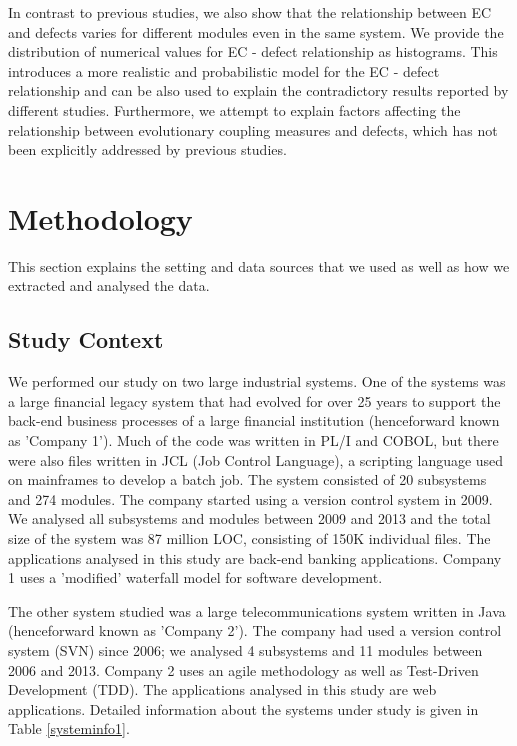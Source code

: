 \documentclass[times]{smrauth}
\begin{document}
In contrast to previous studies, we also show that the relationship between EC and defects varies for different modules even in the same system. We provide the distribution of numerical values for EC - defect relationship as histograms. This introduces a more realistic and probabilistic model for the EC - defect relationship and can be also used to explain the contradictory results reported by different studies. Furthermore, we attempt to explain factors affecting the relationship between evolutionary coupling measures and defects, which has not been explicitly addressed by previous studies.

\newpage

\section{Methodology}

This section explains the setting and data sources that we used as well as how we extracted and analysed the data.

\subsection{Study Context}

We performed our study on two large industrial systems. One of the systems was a large financial legacy system that had evolved for over 25 years to support the back-end business processes of a large financial institution (henceforward known as 'Company 1'). Much of the code was written in PL/I and COBOL, but there were also files written in JCL (Job Control Language), a scripting language used on mainframes to develop a batch job. The system consisted of 20 subsystems and 274 modules. The company started using a version control system in 2009. We analysed all subsystems and modules between 2009 and 2013 and the total size of the system was 87 million LOC, consisting of 150K individual files. The applications analysed in this study are back-end banking applications. Company 1 uses a 'modified' waterfall model for software development. 

The other system studied was a large telecommunications system written in Java (henceforward known as 'Company 2'). The company had used a version control system (SVN) since 2006; we analysed 4 subsystems and 11 modules between 2006 and 2013. Company 2 uses an agile methodology as well as Test-Driven Development (TDD). The applications analysed in this study are web applications. Detailed information about the systems under study is given in Table \ref{systeminfo1}.
\end{document}
